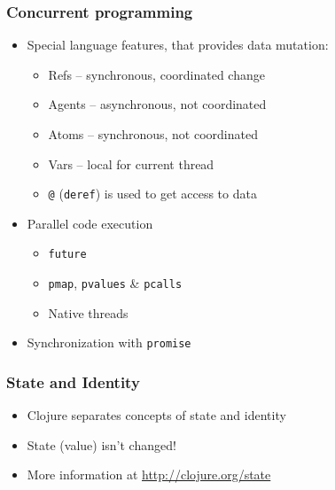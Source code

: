 \begin{frame}[t,fragile]
  \frametitle{Concurrent programming}
  \begin{itemize}
  \item Special language features, that provides data mutation:
    \begin{itemize}
    \item Refs -- synchronous, coordinated change
    \item Agents -- asynchronous, not coordinated
    \item Atoms -- synchronous, not coordinated
    \item Vars -- local for current thread
    \item \lstinline|@| (\texttt{deref}) is used to get access to data
    \end{itemize}
  \item Parallel code execution
    \begin{itemize}
    \item \texttt{future}
    \item \texttt{pmap}, \texttt{pvalues} \& \texttt{pcalls}
    \item Native threads
    \end{itemize}
  \item Synchronization with \texttt{promise}
  \end{itemize}
\end{frame}

\begin{frame}[t]
  \frametitle{State and Identity}
  \begin{itemize}
  \item Clojure separates concepts of state and identity
  \item State (value) isn't changed!
  \item More information at \url{http://clojure.org/state}
  \end{itemize}

  \begin{center}
  \end{center}

\end{frame}

